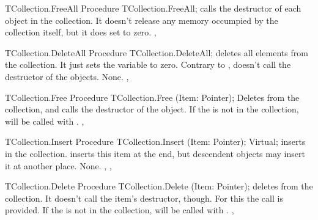 \begin{procedure}{TCollection.FreeAll}
\Declaration
Procedure TCollection.FreeAll;
\Description
{} calls the destructor of each object in the collection.
It doesn't release any memory occumpied by the collection itself, but it
does set  to zero.
\Errors
\SeeAlso
{}, 
\end{procedure}


\html{}


\begin{procedure}{TCollection.DeleteAll}
\Declaration
Procedure TCollection.DeleteAll;
\Description
{} deletes all elements from the collection. It just sets 
the  variable to zero. Contrary to
,  doesn't call the
destructor of the objects.
\Errors
None.
\SeeAlso
{}, 
\end{procedure}

\html{}


\begin{procedure}{TCollection.Free}
\Declaration
Procedure TCollection.Free (Item: Pointer);
\Description
{} Deletes  from the collection, and calls the destructor
 of the object.
\Errors
If the  is not in the collection,  will be called with
.
\SeeAlso
{},
\end{procedure}


\html{}

\begin{procedure}{TCollection.Insert}
\Declaration
Procedure TCollection.Insert (Item: Pointer); Virtual;
\Description
{} inserts  in the collection. 
inserts this item at the end, but descendent objects may insert it at
another place.
\Errors
None.
\SeeAlso
{}, ,
\end{procedure}


\begin{procedure}{TCollection.Delete}
\Declaration
Procedure TCollection.Delete (Item: Pointer);
\Description
{} deletes  from the collection. It doesn't call the
item's destructor, though. For this the 
call is provided.
\Errors
If the  is not in the collection,  will be called with
.
\SeeAlso
{},
\end{procedure}



